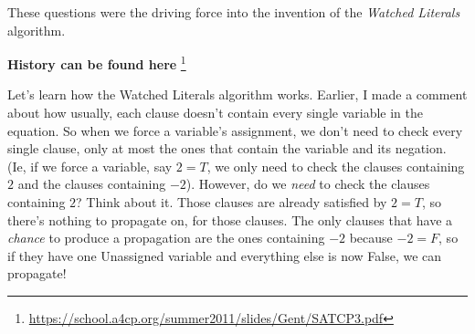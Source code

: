 \documentclass[../main.tex]{subfiles}
\begin{document}
These questions were the driving force into the invention of the 
\textit{Watched Literals} algorithm.

\textbf{History can be found here}
\footnote{\url{https://school.a4cp.org/summer2011/slides/Gent/SATCP3.pdf}}

Let's learn how the Watched Literals algorithm works. Earlier, I made a comment 
about how usually, each clause doesn't contain every single variable in the 
equation. So when we force a variable's assignment, we don't need to check 
every single clause, only at most the ones that contain the variable and its 
negation. (Ie, if we force a variable, say $2 = T$, we only need to check the clauses 
containing $2$ and the clauses containing $-2$). However, do we \textit{need} to 
check the clauses containing $2$? Think about it. Those clauses are already 
satisfied by $2 = T$, so there's nothing to propagate on, for those clauses. 
The only clauses that have a \textit{chance} to produce a propagation are the 
ones containing $-2$ because $-2 = F$, so if they have one Unassigned variable 
and everything else is now False, we can propagate!
\end{document}
